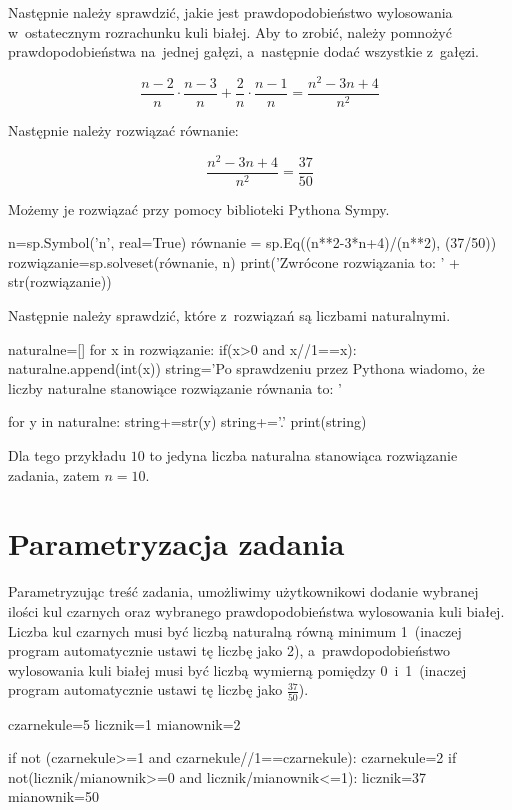 \documentclass{mwart}
\begin{document}
Następnie należy sprawdzić, jakie jest prawdopodobieństwo wylosowania w~ostatecznym rozrachunku kuli białej. Aby to zrobić, należy pomnożyć prawdopodobieństwa na~jednej gałęzi, a~następnie dodać wszystkie z~gałęzi.

\begin{equation}
\frac{n-2}{n}\cdot\frac{n-3}{n}+\frac{2}{n}\cdot\frac{n-1}{n} = \frac{n^2-3n+4}{n^2}
\end{equation}

Następnie należy rozwiązać równanie:

\begin{equation}
\frac{n^2-3n+4}{n^2} = \frac{37}{50}
\end{equation}

Możemy je rozwiązać przy pomocy biblioteki Pythona Sympy.
\begin{pycode}
n=sp.Symbol('n', real=True)
równanie = sp.Eq((n**2-3*n+4)/(n**2), (37/50))
rozwiązanie=sp.solveset(równanie, n)
print('Zwrócone rozwiązania to: ' + str(rozwiązanie))
\end{pycode}

Następnie należy sprawdzić, które z~rozwiązań są liczbami naturalnymi.

\begin{pycode}
naturalne=[]
for x in rozwiązanie:
	if(x>0 and x//1==x):
		naturalne.append(int(x))
string='Po sprawdzeniu przez Pythona wiadomo, że liczby naturalne stanowiące rozwiązanie równania to: '

for y in naturalne:
	string+=str(y)
string+='.'
print(string)
\end{pycode}

Dla tego przykładu $10$ to jedyna liczba naturalna stanowiąca rozwiązanie zadania, zatem $n = 10$.

\section{Parametryzacja zadania}
Parametryzując treść zadania, umożliwimy użytkownikowi dodanie wybranej ilości kul czarnych oraz wybranego prawdopodobieństwa wylosowania kuli białej. Liczba kul czarnych musi być liczbą naturalną równą minimum 1~(inaczej program automatycznie ustawi tę liczbę jako 2), a~prawdopodobieństwo wylosowania kuli białej musi być liczbą wymierną pomiędzy 0~i~1~(inaczej program automatycznie ustawi tę liczbę jako $\frac{37}{50}$).

\begin{pycode}
czarnekule=5
licznik=1
mianownik=2


if not (czarnekule>=1 and czarnekule//1==czarnekule):
	czarnekule=2
if not(licznik/mianownik>=0 and licznik/mianownik<=1):
	licznik=37
	mianownik=50

\end{pycode}
\end{document}
